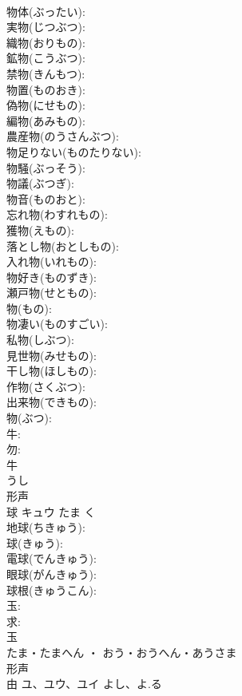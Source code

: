 \documentclass[8pt]{extreport}
\begin{document}
\begin{CJK}{UTF8}{min}
\\	物体(ぶったい): 
\\	実物(じつぶつ): 
\\	織物(おりもの): 
\\	鉱物(こうぶつ): 
\\	禁物(きんもつ): 
\\	物置(ものおき): 
\\	偽物(にせもの): 
\\	編物(あみもの): 
\\	農産物(のうさんぶつ): 
\\	物足りない(ものたりない): 
\\	物騒(ぶっそう): 
\\	物議(ぶつぎ): 
\\	物音(ものおと): 
\\	忘れ物(わすれもの): 
\\	獲物(えもの): 
\\	落とし物(おとしもの): 
\\	入れ物(いれもの): 
\\	物好き(ものずき): 
\\	瀬戸物(せともの): 
\\	物(もの): 
\\	物凄い(ものすごい): 
\\	私物(しぶつ): 
\\	見世物(みせもの): 
\\	干し物(ほしもの): 
\\	作物(さくぶつ): 
\\	出来物(できもの): 
\\	物(ぶつ): 
\\	牛: 
\\	勿: 
\\	牛	
\\	うし	
\\	形声 
\\	球	キュウ	たま	く	
\\	地球(ちきゅう): 
\\	球(きゅう): 
\\	電球(でんきゅう): 
\\	眼球(がんきゅう): 
\\	球根(きゅうこん): 
\\	玉: 
\\	求: 
\\	玉	
\\	たま・たまへん ・ おう・おうへん・あうさま	
\\	形声 
\\	由	ユ、ユウ、ユイ	よし、よ.る		

\end{CJK}
\end{document}
